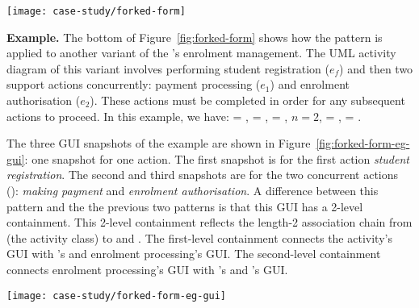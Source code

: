 \begin{figure*}[ht]
	\begin{center}
		\texttt{[image: case-study/forked-form]}
	\end{center}
	\vspace{-0.4cm}
	\caption{The forked pattern form.} %
	\label{fig:forked-form}
		\vspace{-0.4cm}
\end{figure*}

\noindent\textbf{Example.}
The bottom of Figure~\ref{fig:forked-form} shows how the pattern is applied to another variant of the \courseman's enrolment management. The UML activity diagram of this variant involves performing student registration ($ e_f $) and then two support actions concurrently: payment processing ($ e_1 $) and enrolment authorisation ($ e_2 $). These actions must be completed in order for any subsequent actions to proceed.
%
In this example, we have:  = ,  = ,  = , $ n = 2 $,  = ,  = .

The three GUI snapshots of the example are shown in Figure~\ref{fig:forked-form-eg-gui}: one snapshot for one action. The first snapshot is for the first action \textit{student registration}. The second and third snapshots are for the two concurrent actions (\resp): \textit{making payment} and \textit{enrolment authorisation}. A difference between this pattern and the the previous two patterns is that this GUI has a 2-level containment. This 2-level containment reflects the length-2 association chain from  (the activity class) to  and . The first-level containment connects the activity's GUI with 's and enrolment processing's GUI. The second-level containment connects enrolment processing's GUI with 's and 's GUI.
\begin{figure*}[!ht]
	\begin{center}
		\texttt{[image: case-study/forked-form-eg-gui]}
	\end{center}
	\vspace{-0.4cm}
	\caption{The forked pattern form view of enrolment management activity.} %
	\label{fig:forked-form-eg-gui}

\end{figure*}

